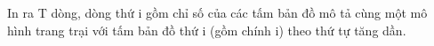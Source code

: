 In ra T dòng, dòng thứ i gồm chỉ số của các tấm bản đồ mô tả cùng một mô hình trang trại với tấm bản đồ thứ i (gồm chính i) theo thứ tự tăng dần.